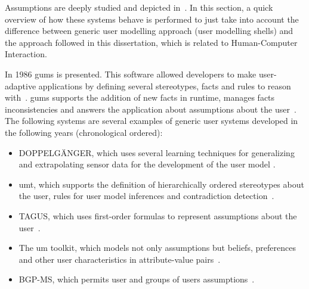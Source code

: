 % 

Assumptions are deeply studied and depicted in~\citep{pohl_logic_based_1999}. 
In this section, a quick overview of how these systems behave is performed to 
just take into account the difference between generic user modelling approach 
(user modelling shells) and the approach followed in this dissertation, which 
is related to Human-Computer Interaction.

In 1986 \ac{gums} is presented. This software allowed developers to make 
user-adaptive applications by defining several stereotypes, facts and rules to 
reason with~\citep{finin_gums_1986}. \acs{gums} supports the addition of new 
facts in runtime, manages facts inconsistencies and answers the application 
about assumptions about the user~\citep{kobsa_generic_2001}. The following 
systems are several examples of generic user systems developed in the following 
years (chronological ordered):

\begin{itemize}
  \item DOPPELGÄNGER, which uses several learning techniques for generalizing
  and extrapolating sensor data for the development of the user model
  \citep{orwant_doppelgangeruser_1991}.
  \item \ac{umt}, which supports the definition of hierarchically ordered 
  stereotypes about the user, rules for user model inferences and contradiction 
  detection~\citep{brajnik1994shell}.
  \item TAGUS, which uses first-order formulas to represent assumptions about
  the user~\citep{paiva1994tagus}.
  \item The um toolkit, which models not only assumptions but beliefs, preferences and other
  user characteristics in attribute-value pairs~\citep{kay1994toolkit}.
  \item BGP-MS, which permits user and groups of users assumptions~\citep{kobsa1994user}.
\end{itemize}

